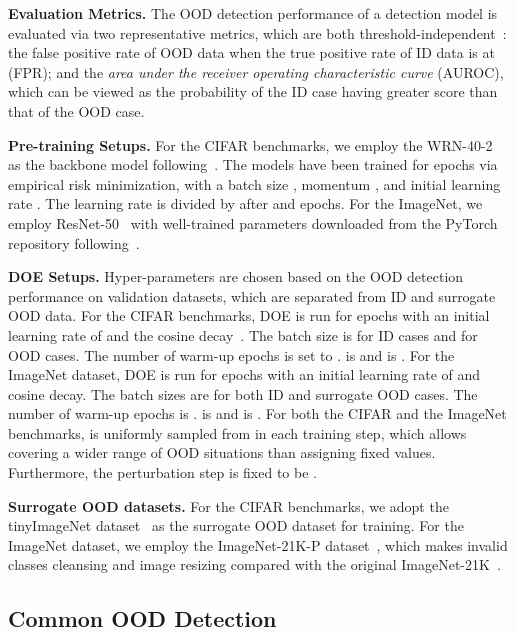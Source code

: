 \documentclass{article} \usepackage{iclr2022_conference,times}
\begin{document}
\textbf{Evaluation Metrics.} The OOD detection performance of a detection model is evaluated via two representative metrics, which are both threshold-independent~\citep{DavisG06}: the false positive rate of OOD data when the true positive rate of ID data is at  (FPR); and the \emph{area under the receiver operating characteristic curve} (AUROC), which can be viewed as the probability of the ID case having greater score than that of the OOD case.

\textbf{Pre-training Setups.} {For the CIFAR benchmarks, we employ the WRN-40-2~\citep{zagoruyko2016wide} as the backbone model following~\citep{liu2020energy}. The models have been trained for  epochs via empirical risk minimization, with a batch size , momentum , and initial learning rate . The learning rate is divided by  after  and  epochs. For the ImageNet, we employ ResNet-50~\citep{he2016deep} with well-trained parameters downloaded from the PyTorch repository following~\citep{sun2021react}. }

\textbf{DOE Setups.} {Hyper-parameters are chosen based on the OOD detection performance on validation datasets, which are separated from ID and surrogate OOD data.} For the CIFAR benchmarks, DOE is run for  epochs with an initial learning rate of  and the cosine decay~\citep{LoshchilovH17}. The batch size is  for ID cases and  for OOD cases. The number of warm-up epochs is set to .  is  and  is . For the ImageNet dataset, DOE is run for  epochs with an initial learning rate of  and cosine decay. The batch sizes are  for both ID and surrogate OOD cases. The number of warm-up epochs is .   is  and  is . For both the CIFAR and the ImageNet benchmarks,  is uniformly sampled from  in each training step, which allows covering a wider range of OOD situations than assigning fixed values. Furthermore, the perturbation step is fixed to be . 

\textbf{Surrogate OOD datasets.} For the CIFAR benchmarks, we adopt the  tinyImageNet dataset~\citep{le2015tiny} as the surrogate OOD dataset for training. For the ImageNet dataset, we employ the ImageNet-21K-P dataset~\citep{ridnik2021imagenet}, which makes invalid classes cleansing and image resizing compared with the original ImageNet-21K~\citep{deng2009imagenet}. 



\subsection{Common OOD Detection} \label{sec: far OOD}
\end{document}
